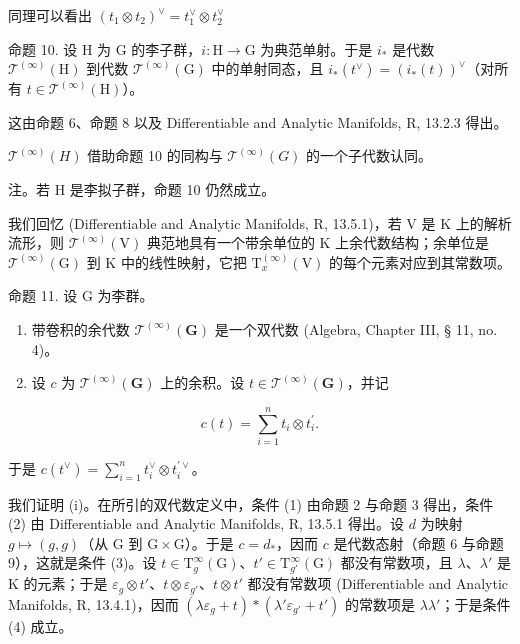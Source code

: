 同理可以看出 \((t_1\otimes t_2)^\vee = t_1^\vee \otimes t_2^\vee\)

命题 10. 设 H 为 G 的李子群，\(i: \mathrm{H} \to \mathrm{G}\) 为典范单射。于是 \(i_*\) 是代数 \(\mathcal{T}^{(\infty)}(\mathrm{H})\) 到代数 \(\mathcal{T}^{(\infty)}(\mathrm{G})\) 中的单射同态，且 \(i_*(t^\vee) = (i_*(t))^{\vee}\)（对所有 \(t \in \mathcal{T}^{(\infty)}(\mathrm{H})\)）。

这由命题 6、命题 8 以及 Differentiable and Analytic Manifolds, R, 13.2.3 得出。

\(\mathcal{T}^{(\infty)}(H)\) 借助命题 10 的同构与 \(\mathcal{T}^{(\infty)}(G)\) 的一个子代数认同。

注。若 H 是李拟子群，命题 10 仍然成立。

我们回忆 (Differentiable and Analytic Manifolds, R, 13.5.1)，若 V 是 K 上的解析流形，则 \(\mathcal{T}^{(\infty)}(\mathrm{V})\) 典范地具有一个带余单位的 K 上余代数结构；余单位是 \(\mathcal{T}^{(\infty)}(\mathrm{G})\) 到 K 中的线性映射，它把 \(\mathrm{T}_x^{(\infty)}(\mathrm{V})\) 的每个元素对应到其常数项。

命题 11. 设 G 为李群。

\begin{enumerate}
\def\labelenumi{(\roman{enumi})}
\item
  带卷积的余代数 \(\mathcal{T}^{(\infty)}(\mathbf{G})\) 是一个双代数 (Algebra, Chapter III, § 11, no. 4)。
\item
  设 \(c\) 为 \(\mathcal{T}^{(\infty)}(\mathbf{G})\) 上的余积。设 \(t \in \mathcal{T}^{(\infty)}(\mathbf{G})\)，并记
\end{enumerate}

\[
c (t) = \sum_ {i = 1} ^ {n} t _ {i} \otimes t _ {i} ^ {\prime}.
\]

于是 \(c(t^{\vee}) = \sum_{i=1}^{n} t_{i}^{\vee} \otimes t_{i}^{\prime\vee}\)。

我们证明 (i)。在所引的双代数定义中，条件 (1) 由命题 2 与命题 3 得出，条件 (2) 由 Differentiable and Analytic Manifolds, R, 13.5.1 得出。设 \(d\) 为映射 \(g \mapsto (g, g)\)（从 G 到 \(\mathrm{G} \times \mathrm{G}\)）。于是 \(c = d_{*}\)，因而 \(c\) 是代数态射（命题 6 与命题 9），这就是条件 (3)。设 \(t \in \mathrm{T}_{g}^{\infty}(\mathrm{G})\)、\(t' \in \mathrm{T}_{g'}^{\infty}(\mathrm{G})\) 都没有常数项，且 \(\lambda\)、\(\lambda'\) 是 K 的元素；于是 \(\varepsilon_{g} \otimes t'\)、\(t \otimes \varepsilon_{g'}\)、\(t \otimes t'\) 都没有常数项 (Differentiable and Analytic Manifolds, R, 13.4.1)，因而 \((\lambda\varepsilon_{g} + t) * (\lambda' \varepsilon_{g'} + t')\) 的常数项是 \(\lambda\lambda'\)；于是条件 (4) 成立。

